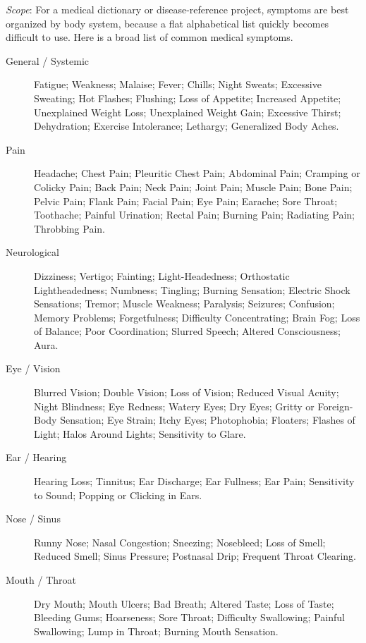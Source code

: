\small
\noindent\textit{Scope}: For a medical dictionary or disease-reference project, symptoms are best organized by body system, because a flat alphabetical list quickly becomes difficult to use. Here is a broad list of common medical symptoms.

\medskip
\begin{description}
\item[General / Systemic] Fatigue; Weakness; Malaise; Fever; Chills; Night Sweats; Excessive Sweating; Hot Flashes; Flushing; Loss of Appetite; Increased Appetite; Unexplained Weight Loss; Unexplained Weight Gain; Excessive Thirst; Dehydration; Exercise Intolerance; Lethargy; Generalized Body Aches.

\item[Pain] Headache; Chest Pain; Pleuritic Chest Pain; Abdominal Pain; Cramping or Colicky Pain; Back Pain; Neck Pain; Joint Pain; Muscle Pain; Bone Pain; Pelvic Pain; Flank Pain; Facial Pain; Eye Pain; Earache; Sore Throat; Toothache; Painful Urination; Rectal Pain; Burning Pain; Radiating Pain; Throbbing Pain.

\item[Neurological] Dizziness; Vertigo; Fainting; Light-Headedness; Orthostatic Lightheadedness; Numbness; Tingling; Burning Sensation; Electric Shock Sensations; Tremor; Muscle Weakness; Paralysis; Seizures; Confusion; Memory Problems; Forgetfulness; Difficulty Concentrating; Brain Fog; Loss of Balance; Poor Coordination; Slurred Speech; Altered Consciousness; Aura.

\item[Eye / Vision] Blurred Vision; Double Vision; Loss of Vision; Reduced Visual Acuity; Night Blindness; Eye Redness; Watery Eyes; Dry Eyes; Gritty or Foreign-Body Sensation; Eye Strain; Itchy Eyes; Photophobia; Floaters; Flashes of Light; Halos Around Lights; Sensitivity to Glare.

\item[Ear / Hearing] Hearing Loss; Tinnitus; Ear Discharge; Ear Fullness; Ear Pain; Sensitivity to Sound; Popping or Clicking in Ears.

\item[Nose / Sinus] Runny Nose; Nasal Congestion; Sneezing; Nosebleed; Loss of Smell; Reduced Smell; Sinus Pressure; Postnasal Drip; Frequent Throat Clearing.

\item[Mouth / Throat] Dry Mouth; Mouth Ulcers; Bad Breath; Altered Taste; Loss of Taste; Bleeding Gums; Hoarseness; Sore Throat; Difficulty Swallowing; Painful Swallowing; Lump in Throat; Burning Mouth Sensation.


\end{description}
